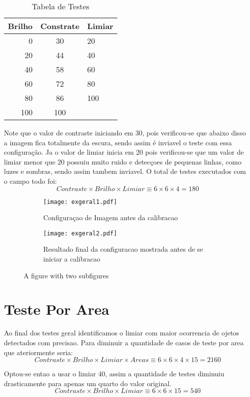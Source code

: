 \begin{table}[h]
\centering
\caption{Tabela de Testes}
\begin{tabular}{r|c|l}
Brilho & Constrate & Limiar \\ %
\hline                               %
0 & 30 &  20\\
\hline 
20 &  44 &  40\\
\hline 
40 & 58 &  60 \\
\hline 
60 &  72 &  80\\
\hline 
80 & 86  & 100\\
\hline 
100 & 100  & \\
\hline  
\end{tabular}
\end{table}
Note que o valor de contraste iniciando em 30, pois verificou-se que abaixo disso a imagem fica totalmente da escura, sendo assim é inviavel o teste com essa configuração. Ja o valor de limiar inicia em 20 pois verificou-se que um valor de limiar menor que 20 possuiu muito ruido e detecçoes de pequenas linhas, como luzes e sombras, sendo assim tambem inviavel.
O total de testes executados com o campo todo foi:
\begin{displaymath}
 Contraste \times Brilho \times Limiar \equiv 6 \times 6 \times 4 = 180
\end{displaymath}
	
	
	
	
	
	\begin{figure}
\centering
\begin{subfigure}{.5\textwidth}
  \centering
  \texttt{[image: exgeral1.pdf]}
  \caption{Configuraçao de Imagem antes da calibracao}
  \label{fig:sub1}
\end{subfigure}%
\begin{subfigure}{.5\textwidth}
  \centering
  \texttt{[image: exgeral2.pdf]}
  \caption{Resultado final da configuracao mostrada antes de se iniciar a calibracao}
  \label{fig:sub2}
\end{subfigure}
\caption{A figure with two subfigures}
\label{fig:test}
\end{figure}
	
	
	
	\section{Teste Por Area}
	Ao final dos testes geral identificamos o limiar com maior ocorrencia de ojetos detectados com precisao. Para diminuir a quantidade de casos de teste por area que  ateriormente seria:
	\begin{displaymath}
 Contraste \times Brilho \times Limiar \times Areas \equiv 6 \times 6 \times 4  \times 15 = 2160
\end{displaymath}

Optou-se entao a usar o limiar 40, assim a quantidade de testes diminuiu drasticamente para apenas um quarto do valor original.
	\begin{displaymath}
 Contraste \times Brilho \times Limiar \equiv 6 \times 6 \times 15 = 540
\end{displaymath}